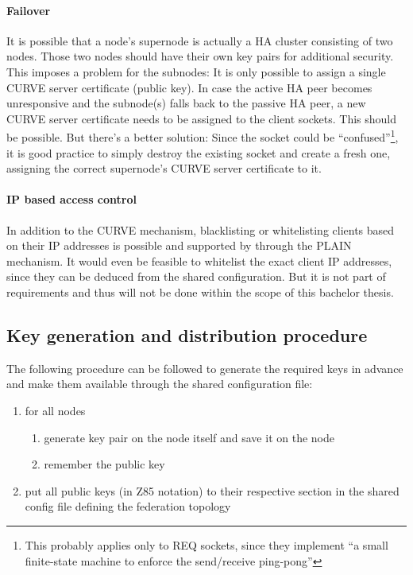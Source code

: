 \paragraph{Failover}\label{sec:approach:encryption:ha}
It is possible that a node's supernode is actually a HA cluster consisting of
two nodes. Those two nodes should have their own key pairs for additional
security. This imposes a problem for the subnodes: It is only possible to assign
a single CURVE server certificate (public key). In case the active HA peer becomes
unresponsive and the subnode(s) falls back to the passive HA peer, a new CURVE
server certificate needs to be assigned to the client sockets. This should be
possible. But there's a better solution:
Since the socket could be \cite[Binary Star Implementation, Binary Star client
in C]{zmq:zguide} ``confused''\footnote{This probably applies only to REQ
sockets, since they implement \cite[Client-Side Reliability (Lazy Pirate
Pattern)]{zmq:zguide} ``a small finite-state machine to enforce the
send/receive ping-pong''}, it is good practice to simply destroy the existing
socket and create a fresh one, assigning the correct supernode's CURVE server
certificate to it.

\paragraph{IP based access control}
In addition to the CURVE mechanism, blacklisting or whitelisting clients based
on their \gls{IP} addresses is possible and supported by
 through the PLAIN mechanism. It would even be
feasible to whitelist the exact client IP addresses, since they can be deduced
from the shared configuration. But it is not part of requirements and thus will not
be done within the scope of this bachelor thesis.

\subsection{Key generation and distribution procedure}
The following procedure can be followed to generate the required keys in
advance and make them available through the shared configuration file:

\begin{enumerate}
	\item for all nodes
	\begin{enumerate}
		\item generate key pair on the node itself and save it on the
			node
		\item remember the public key
	\end{enumerate}

	\item put all public keys (in Z85 notation) to their respective section
		in the shared config file defining the federation topology
\end{enumerate}

